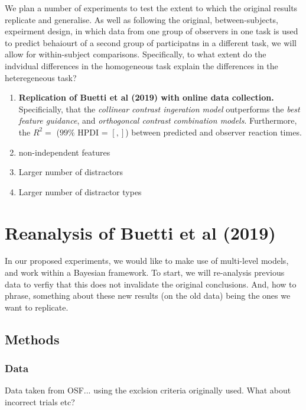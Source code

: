 We plan a number of experiments to test the extent to which the original results replicate and generalise. As well as following the original, between-subjects, expeirment design, in which data from one group of observers in one task is used to predict behaiourt of a second group of participatns in a different task, we will allow for within-subject comparisons. Specifically, to what extent do the indvidual differences in the homogeneous task explain the differences in the heteregeneous task? 

\begin{enumerate}
\item \textbf{Replication of Buetti et al (2019) with online data collection.} Specificially, that the \textit{collinear contrast ingeration model} outperforms the \textit{best feature guidance}, and \textit{orthogoncal contrast combination models}.  Furthermore, the $R^2 = $ ($99\%$ HPDI = $[, ]$) between predicted and observer reaction times.\\
\item non-independent features \\
\item Larger number of distractors \\ 
\item Larger number of distractor types \\ 
\end{enumerate}

\section{Reanalysis of Buetti et al (2019)}

In our proposed experiments, we would like to make use of multi-level models, and work within a Bayesian framework. To start, we will re-analysis previous data to verfiy that this does not invalidate the original conclusions. And, how to phrase, something about these new results (on the old data) being the ones we want to replicate. 

\subsection{Methods}

\subsubsection{Data}

Data taken from OSF... using the exclsion criteria originally used. What about incorrect trials etc? 


